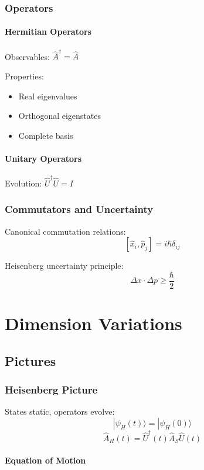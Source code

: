 \documentclass[12pt]{book}
\begin{document}
\section{Operators}

\subsection{Hermitian Operators}

Observables: $\hat{A}^\dagger = \hat{A}$

Properties:
\begin{itemize}
  \item Real eigenvalues
  \item Orthogonal eigenstates
  \item Complete basis
\end{itemize}

\subsection{Unitary Operators}

Evolution: $\hat{U}^\dagger\hat{U} = I$

\section{Commutators and Uncertainty}

Canonical commutation relations:
$$[\hat{x}_i, \hat{p}_j] = i\hbar\delta_{ij}$$

Heisenberg uncertainty principle:
$$\Delta x \cdot \Delta p \geq \frac{\hbar}{2}$$

\part{Dimension Variations}

\chapter{Pictures}

\section{Heisenberg Picture}

States static, operators evolve:
$$|\psi_H(t)\rangle = |\psi_H(0)\rangle$$
$$\hat{A}_H(t) = \hat{U}^\dagger(t)\hat{A}_S\hat{U}(t)$$

\subsection{Equation of Motion}
\end{document}
